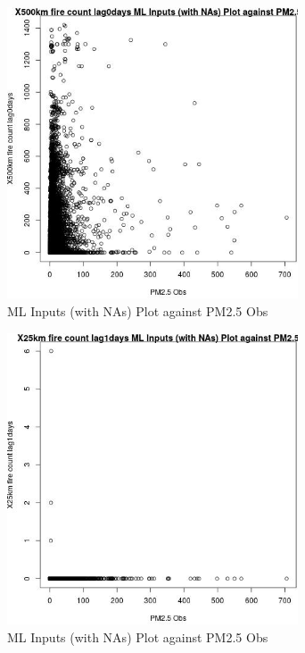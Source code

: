 \begin{figure} 
\centering  
\includegraphics[width=0.77\textwidth]{Code_Outputs/Report_ML_input_PM25_Step4_part_e_de_duplicated_aves_compiled_2019-05-14wNAs_X500km_fire_count_lag0daysvPM25_Obs.jpg} 
\caption{\label{fig:Report_ML_input_PM25_Step4_part_e_de_duplicated_aves_compiled_2019-05-14wNAsX500km_fire_count_lag0daysvPM25_Obs}ML Inputs (with NAs) Plot against PM2.5 Obs} 
\end{figure} 
 

\begin{figure} 
\centering  
\includegraphics[width=0.77\textwidth]{Code_Outputs/Report_ML_input_PM25_Step4_part_e_de_duplicated_aves_compiled_2019-05-14wNAs_X25km_fire_count_lag1daysvPM25_Obs.jpg} 
\caption{\label{fig:Report_ML_input_PM25_Step4_part_e_de_duplicated_aves_compiled_2019-05-14wNAsX25km_fire_count_lag1daysvPM25_Obs}ML Inputs (with NAs) Plot against PM2.5 Obs} 
\end{figure} 
 


